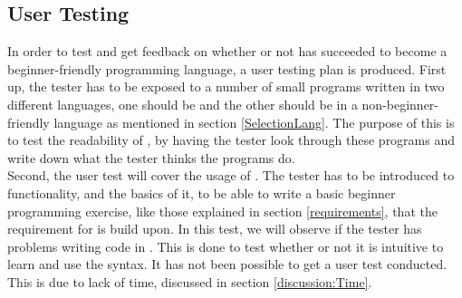 \subsection{User Testing}\label{usertesting}
In order to test and get feedback on whether or not \lang has succeeded to become a beginner-friendly programming language, a user testing plan is produced.
First up, the tester has to be exposed to a number of small programs written in two different languages, one should be \lang and the other should be in a non-beginner-friendly language as mentioned in section \ref{SelectionLang}. The purpose of this is to test the readability of \lang, by having the tester look through these programs and write down what the tester thinks the programs do.\\



Second, the user test will cover the usage of \lang. The tester has to be introduced to \lang functionality, and the basics of it, to be able to write a basic beginner programming exercise, like those explained in section \ref{requirements}, that the requirement for \lang is build upon. In this test, we will observe if the tester has problems writing code in \lang. This is done to test whether or not it is intuitive to learn and use the syntax. It has not been possible to get a user test conducted. This is due to lack of time, discussed in section \ref{discussion:Time}. 


